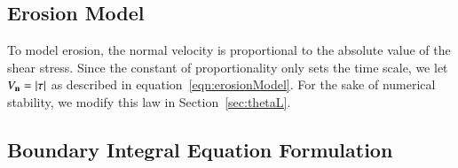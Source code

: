 \documentclass[preprint, 10pt]{elsarticle}
\begin{document}
\subsection{Erosion Model} 
\label{sec:erosion}

To model erosion, the normal velocity is  proportional to the absolute
value of the shear stress.   Since the constant of proportionality only
sets the time scale, we let $V_{\mathbf{n}} = |\tau|$ as described in
equation~\eqref{eqn:erosionModel}. For the sake of numerical stability,
we modify this law in Section~\ref{sec:thetaL}.

\subsection{Boundary Integral Equation Formulation} 
\label{sec:bies}
\end{document}
